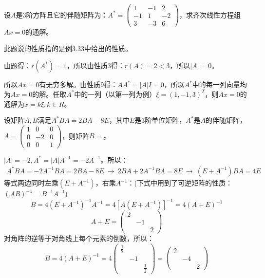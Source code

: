 \documentclass[a4paper]{report}
\begin{document}
\EX 设$A$是3阶方阵且它的伴随矩阵为：$A^*=
\begin{pmatrix}
1&-1&2\\
-1&1&-2\\
3&-3&6
\end{pmatrix}$，求齐次线性方程组$Ax=0$的通解。

\begin{jie}
此题说的性质指的是例3.33中给出的性质。

由题得：$r(A^*)=1$，所以由性质3得：$r(A)=2<3$，所以$|A|=0$。

所以$Ax=0$有无穷多解。由性质9得：$AA^*=|A|I=0$，所以$A^*$中的每一列向量均为$Ax=0$的解。任取$A^*$中的一列（以第一列为例）$\xi=(1,-1,3)^T$，则$Ax=0$的通解为$x=k\xi,k\in R$。
\end{jie}

\EX 设矩阵$A,B$满足$A^*BA=2BA-8E$，其中$E$是3阶单位矩阵，$A^*$是$A$的伴随矩阵，$
A=
\begin{pmatrix}
1&0&0\\
0&-2&0\\
0&0&1
\end{pmatrix}
$，则矩阵$B=$\underline{\hphantom{~~~~~~~~}}。

\begin{jie}
$|A|=-2,A^*=|A|A^{-1}=-2A^{-1}$。所以：
\begin{align*}
A^*BA=-2A^{-1}BA=2BA-8E~\rightarrow~2BA+2A^{-1}BA=8E~\rightarrow~(E+A^{-1})BA=4E
\end{align*}
等式两边同时左乘$(E+A^{-1})$，右乘$A^{-1}$：(下式中用到了可逆矩阵的性质：$(AB)^{-1}=B^{-1}A^{-1}$)
\begin{equation*}
B=4(E+A^{-1})^{-1}A^{-1}=4[A(E+A^{-1})]^{-1}=4(A+E)^{-1}
\end{equation*}
\begin{equation*}
A+E=
\begin{pmatrix}
2\\
&-1\\
&&2
\end{pmatrix}
\end{equation*}
对角阵的逆等于对角线上每个元素的倒数，所以：
\begin{equation*}
B=4(A+E)^{-1}=4
\begin{pmatrix}
\frac{1}{2}\\
&-1\\
&&\frac{1}{2}
\end{pmatrix}=
\begin{pmatrix}
2\\
&-4\\
&&2
\end{pmatrix}
\end{equation*}
\end{jie}
\end{document}
